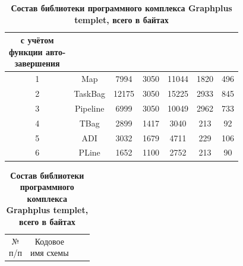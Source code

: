 \begin{table}[p!]
\begin{tabular}{c|c|c|c|c|c|c}
\cbox{\footnotesize с учётом \\ \footnotesize  функции авто- \\ \footnotesize  завершения}\\

\hline

\rule{0mm}{12pt}%

1 & Map & \phantom{1}7994 & 3050 & 11044 & 1820 & 496\\

2 & TaskBag & 12175 & 3050 & 15225 & 2933 & 845\\

3 & Pipeline & \phantom{1}6999 & 3050 & 10049 & 2962 & 733\\

4 & TBag & \phantom{1}2899 & 1417 & \phantom{1}3040 & \phantom{1}213 & \phantom{1}92\\

5 & ADI & \phantom{1}3032 & 1679 & \phantom{1}4711 & \phantom{1}229 & 106\\

6 & PLine & \phantom{1}1652 & 1100 & \phantom{1}2752 & \phantom{1}213 & \phantom{1}90\\

\hline

\end{tabular} \label{vkl:tab2}


%



\vspace{5mm}




\setlength{\tabcolsep}{18pt}

\centering

\small

\caption{\bf Состав библиотеки программного комплекса Graphplus templet, всего в байтах} \vspace{-3mm} \centering

\begin{tabular}{c|c|c|c}

\hline 

\cbox{\footnotesize № \\ \footnotesize п/п} & 

\cbox{\footnotesize Кодовое \\ \footnotesize имя схемы} &  


\end{tabular}
\end{table}
